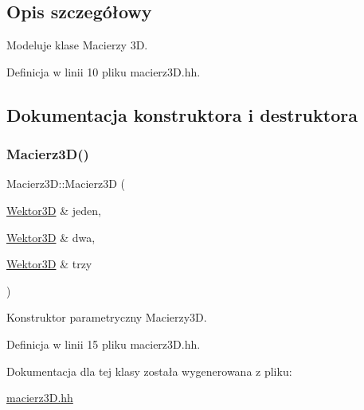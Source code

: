 \subsection{Opis szczegółowy}
Modeluje klase Macierzy 3D. 

Definicja w linii 10 pliku macierz3\+D.\+hh.



\subsection{Dokumentacja konstruktora i destruktora}
\mbox{\label{class_macierz3_d_a815b0fe484cefae2f0f798a0c45b55c7}} 
\subsubsection{\texorpdfstring{Macierz3D()}{Macierz3D()}}
{\footnotesize\ttfamily Macierz3\+D\+::\+Macierz3D (\begin{DoxyParamCaption}\item[{\mbox{\hyperlink{class_wektor3_d}{Wektor3D}} \&}]{jeden,  }\item[{\mbox{\hyperlink{class_wektor3_d}{Wektor3D}} \&}]{dwa,  }\item[{\mbox{\hyperlink{class_wektor3_d}{Wektor3D}} \&}]{trzy }\end{DoxyParamCaption})\hspace{0.3cm}{\ttfamily [inline]}}

Konstruktor parametryczny Macierzy3D. 

Definicja w linii 15 pliku macierz3\+D.\+hh.



Dokumentacja dla tej klasy została wygenerowana z pliku\+:\begin{DoxyCompactItemize}
\item 
\mbox{\hyperlink{macierz3_d_8hh}{macierz3\+D.\+hh}}\end{DoxyCompactItemize}
